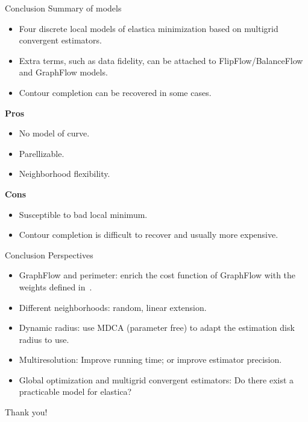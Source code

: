 \begin{frame}
{Conclusion}
{Summary of models}

\begin{itemize}
\item{Four discrete local models of elastica minimization based on multigrid convergent estimators.}
\pause
\item{Extra terms, such as data fidelity, can be attached to FlipFlow/BalanceFlow and GraphFlow models.}
\pause
\item{Contour completion can be recovered in some cases.}
\pause
\end{itemize}

\textbf{Pros}
\begin{itemize}
\item{No model of curve.}
\pause
\item{Parellizable.}
\pause
\item{Neighborhood flexibility.}
\pause
\end{itemize}

\textbf{Cons}
\begin{itemize}
\item{Susceptible to bad local minimum.}
\pause
\item{Contour completion is difficult to recover and usually more expensive.}
\end{itemize}

\end{frame}

\begin{frame}
{Conclusion}
{Perspectives}

\begin{itemize}
\item{GraphFlow and perimeter: enrich the cost function of GraphFlow with the weights defined in~\cite{boykov03geodesics}. }
\pause
\item{Different neighborhoods: random, linear extension.}
\pause
\item{Dynamic radius: use MDCA (parameter free) to adapt the estimation disk radius to use.}
\pause
\item{Multiresolution: Improve running time; or improve estimator precision.}
\pause
\item{Global optimization and multigrid convergent estimators: Do there exist a practicable model for elastica?}
\end{itemize}

\end{frame}

\begin{frame}
\huge
\center
Thank you!
\end{frame}
